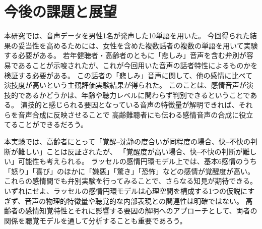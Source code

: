 

%




\section{今後の課題と展望}
\label{sec:Challenges}
本研究では、音声データを男性1名が発声した10単語を用いた。
今回得られた結果の妥当性を高めるためには、女性を含めた複数話者の複数の単語を用いて実験する必要がある。
若年健聴者・高齢者のともに「悲しみ」音声を含む弁別が容易であることが示唆されたが、これが今回用いた音声の話者特性によるものかを
検証する必要がある。
この話者の「悲しみ」音声に関して、他の感情に比べて演技度が高いという主観評価実験結果が得られた。
このことは、感情音声が演技的であるかどうかは、年齢や聴力レベルに関わらず判別できるということである。
演技的と感じられる要因となっている音声の特徴量が解明できれば、それらを音声合成に反映させることで
高齢難聴者にも伝わる感情音声の合成に役立てることができるだろう。

本実験では、高齢者にとって「覚醒–沈静の度合いが同程度の場合、快–不快の判断が難しい」ことは反証されたが、
「覚醒度が高い場合、快–不快の判断が難しい」可能性も考えられる。
ラッセルの感情円環モデル上では、基本6感情のうち「怒り」「喜び」のほかに「嫌悪」「驚き」「恐怖」などの感情が覚醒度が高い。
これらの感情間でも弁別実験を行ってみることで、さらなる知見が期待できる。
いずれにせよ、ラッセルの感情円環モデルは心理空間を構成する1つの仮説にすぎず、音声の物理的特徴量や聴覚的な内部表現との関連性は明確ではない。
高齢者の感情知覚特性とそれに影響する要因の解明へのアプローチとして、両者の関係を聴覚モデルを通して分析することも重要であろう。




